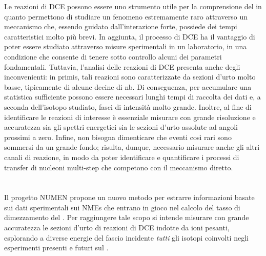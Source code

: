 Le reazioni di DCE possono essere uno strumento utile per la comprensione del \doppiobeta{} in quanto permettono di studiare un fenomeno estremamente raro attraverso un meccanismo che, essendo guidato dall'interazione forte, possiede dei tempi caratteristici molto più brevi. 
In aggiunta, il processo di DCE ha il vantaggio di poter essere studiato attraverso misure sperimentali in un laboratorio, in una condizione che consente di tenere sotto controllo alcuni dei parametri fondamentali.
Tuttavia, l'analisi delle reazioni di DCE presenta anche degli inconvenienti: in primis, tali reazioni sono caratterizzate da sezioni d'urto molto basse, tipicamente di alcune decine di nb.
Di conseguenza, per accumulare una statistica sufficiente possono essere necessari lunghi tempi di raccolta dei dati e, a seconda dell'isotopo studiato, fasci di intensità molto grande.
Inoltre, al fine di identificare le reazioni di interesse è essenziale misurare con grande risoluzione e accuratezza sia gli spettri energetici sia le sezioni d'urto assolute ad angoli prossimi a zero. 
Infine, non bisogna dimenticare che eventi così rari sono sommersi da un grande fondo; risulta, dunque, necessario misurare anche gli altri canali di reazione, in modo da poter identificare e quantificare i processi di transfer di nucleoni multi-step che competono con il meccanismo diretto.




\section{} \label{sez:progetto_numen}

Il progetto NUMEN propone un nuovo metodo per estrarre informazioni basate sui dati sperimentali sui NMEs che entrano in gioco nel calcolo del tasso di dimezzamento del \doppiobeta{}. 
Per raggiungere tale scopo si intende misurare con grande accuratezza le sezioni d'urto di reazioni di DCE indotte da ioni pesanti, esplorando a diverse energie del fascio incidente \emph{tutti} gli isotopi coinvolti negli esperimenti presenti e futuri sul \doppiobeta{}.


